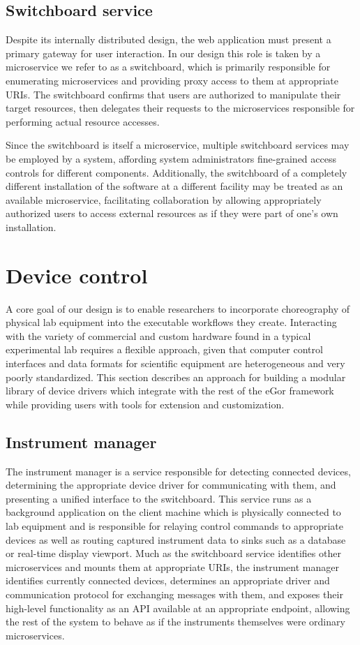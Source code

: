 \documentclass[../thesis]{subfiles}
\begin{document}
\subsection{Switchboard service}
Despite its internally distributed design, the web application must
present a primary gateway for user interaction. In our design this
role is taken by a microservice we refer to as a \gls{switchboard},
which is primarily responsible for enumerating microservices and
providing proxy access to them at appropriate \glspl{URI}. The
\gls{switchboard} confirms that users are authorized to manipulate their
target resources, then delegates their requests to the microservices
responsible for performing actual resource accesses.

Since the \gls{switchboard} is itself a microservice, multiple \gls{switchboard}
services may be employed by a system, affording system administrators
fine-grained access controls for different components. Additionally,
the \gls{switchboard} of a completely different installation of the software
at a different facility may be treated as an available microservice,
facilitating collaboration by allowing appropriately authorized users
to access external resources as if they were part of one's own
installation.

\section{Device control}
A core goal of our design is to enable researchers to incorporate
choreography of physical lab equipment into the executable workflows
they create. Interacting with the variety of commercial and custom
hardware found in a typical experimental lab requires a flexible
approach, given that computer control interfaces and data formats for
scientific equipment are heterogeneous and very poorly
standardized. This section describes an approach for building a
modular library of device drivers which integrate with the rest of the
eGor framework while providing users with tools for extension and
customization.

\subsection{Instrument manager}
The instrument manager is a service responsible for detecting
connected devices, determining the appropriate device driver for
communicating with them, and presenting a unified interface to the
\gls{switchboard}. This service runs as a background application on
the client machine which is physically connected to lab equipment and
is responsible for relaying control commands to appropriate devices as
well as routing captured instrument data to sinks such as a database
or real-time display viewport. Much as the \gls{switchboard} service
identifies other microservices and mounts them at appropriate
\glspl{URI}, the instrument manager identifies currently connected
devices, determines an appropriate driver and communication protocol
for exchanging messages with them, and exposes their high-level
functionality as an \gls{API} available at an appropriate endpoint,
allowing the rest of the system to behave as if the instruments
themselves were ordinary microservices.
\end{document}
